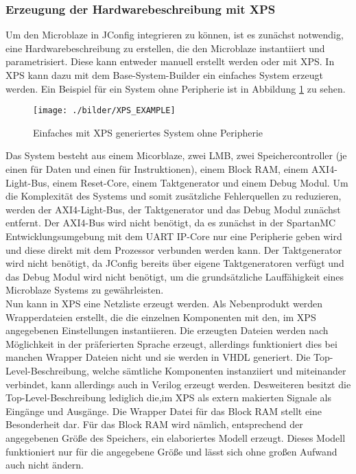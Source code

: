 \subsubsection{Erzeugung der Hardwarebeschreibung mit XPS}
Um den Microblaze in JConfig integrieren zu können, ist es zunächst notwendig, eine Hardwarebeschreibung zu erstellen, die den Microblaze instantiiert und parametrisiert.
Diese kann entweder manuell erstellt werden oder mit XPS. In XPS kann dazu mit dem Base-System-Builder ein einfaches System erzeugt werden. Ein Beispiel für ein System ohne Peripherie ist in Abbildung \ref{fig:XPS_EXAMPLE} zu sehen.
\begin{figure}[ht!]
\centering
\texttt{[image: ./bilder/XPS\_EXAMPLE]}
\caption{Einfaches mit XPS generiertes System ohne Peripherie}
\label{fig:XPS_EXAMPLE}
\end{figure}
Das System besteht aus einem Micorblaze, zwei LMB, zwei Speichercontroller (je einen für Daten und einen für Instruktionen), einem Block RAM, einem AXI4-Light-Bus, einem Reset-Core, einem Taktgenerator und einem Debug Modul. Um die Komplexität des Systems und somit zusätzliche Fehlerquellen zu reduzieren, werden der AXI4-Light-Bus, der Taktgenerator und das Debug Modul zunächst entfernt. Der AXI4-Bus wird nicht benötigt, da es zunächst in der SpartanMC Entwicklungsumgebung mit dem UART IP-Core nur eine Peripherie geben wird und diese direkt mit dem Prozessor verbunden werden kann. Der Taktgenerator wird nicht benötigt, da JConfig bereits über eigene Taktgeneratoren verfügt und das Debug Modul wird nicht benötigt, um die grundsätzliche Lauffähigkeit eines Microblaze Systems zu gewährleisten.\\
Nun kann in XPS eine Netzliste erzeugt werden. Als Nebenprodukt werden Wrapperdateien erstellt, die die einzelnen Komponenten mit den, im XPS angegebenen Einstellungen instantiieren. Die erzeugten Dateien werden nach Möglichkeit in der präferierten Sprache erzeugt, allerdings funktioniert dies bei manchen Wrapper Dateien nicht und sie werden in VHDL generiert. Die Top-Level-Beschreibung, welche sämtliche Komponenten instanziiert und miteinander verbindet, kann allerdings auch in Verilog erzeugt werden. Desweiteren besitzt die Top-Level-Beschreibung lediglich die,im XPS als extern makierten Signale als Eingänge und Ausgänge. Die Wrapper Datei für das Block RAM stellt eine Besonderheit dar. Für das Block RAM wird nämlich, entsprechend der angegebenen Größe des Speichers, ein elaboriertes Modell erzeugt. Dieses Modell funktioniert nur für die angegebene Größe und lässt sich ohne großen Aufwand auch nicht ändern.\\
